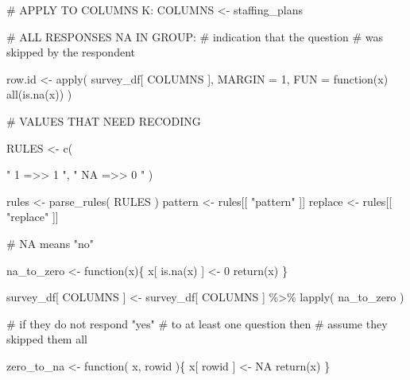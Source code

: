 \documentclass[
  letterpaper,
]{scrbook}
\newenvironment{Shaded}{\begin{snugshade}}{\end{snugshade}}
\newcommand{\AttributeTok}[1]{\textcolor[rgb]{0.40,0.45,0.13}{#1}}
\newcommand{\CommentTok}[1]{\textcolor[rgb]{0.37,0.37,0.37}{#1}}
\newcommand{\ConstantTok}[1]{\textcolor[rgb]{0.56,0.35,0.01}{#1}}
\newcommand{\ControlFlowTok}[1]{\textcolor[rgb]{0.00,0.23,0.31}{#1}}
\newcommand{\DecValTok}[1]{\textcolor[rgb]{0.68,0.00,0.00}{#1}}
\newcommand{\FunctionTok}[1]{\textcolor[rgb]{0.28,0.35,0.67}{#1}}
\newcommand{\NormalTok}[1]{\textcolor[rgb]{0.00,0.23,0.31}{#1}}
\newcommand{\OtherTok}[1]{\textcolor[rgb]{0.00,0.23,0.31}{#1}}
\newcommand{\SpecialCharTok}[1]{\textcolor[rgb]{0.37,0.37,0.37}{#1}}
\newcommand{\StringTok}[1]{\textcolor[rgb]{0.13,0.47,0.30}{#1}}
\begin{document}
\begin{Shaded}
\begin{Highlighting}[]
\CommentTok{\# APPLY TO COLUMNS K:}
\NormalTok{COLUMNS }\OtherTok{\textless{}{-}}\NormalTok{  staffing\_plans}


\CommentTok{\# ALL RESPONSES NA IN GROUP:}
\CommentTok{\# indication that the question}
\CommentTok{\# was skipped by the respondent}

\NormalTok{row.id }\OtherTok{\textless{}{-}} \FunctionTok{apply}\NormalTok{( survey\_df[ COLUMNS ], }
                 \AttributeTok{MARGIN =} \DecValTok{1}\NormalTok{, }
                 \AttributeTok{FUN =} \ControlFlowTok{function}\NormalTok{(x) }\FunctionTok{all}\NormalTok{(}\FunctionTok{is.na}\NormalTok{(x)) ) }

\CommentTok{\# VALUES THAT NEED RECODING}

\NormalTok{RULES }\OtherTok{\textless{}{-}} \FunctionTok{c}\NormalTok{(    }
          
             \StringTok{"    1    =\textgreater{}\textgreater{}     1   "}\NormalTok{, }
             \StringTok{"   NA    =\textgreater{}\textgreater{}     0   "}\NormalTok{   )}


\NormalTok{rules }\OtherTok{\textless{}{-}} \FunctionTok{parse\_rules}\NormalTok{( RULES )          }
\NormalTok{pattern }\OtherTok{\textless{}{-}}\NormalTok{ rules[[ }\StringTok{"pattern"}\NormalTok{ ]]}
\NormalTok{replace }\OtherTok{\textless{}{-}}\NormalTok{ rules[[ }\StringTok{"replace"}\NormalTok{ ]]}

\CommentTok{\# NA means "no"}

\NormalTok{na\_to\_zero }\OtherTok{\textless{}{-}} \ControlFlowTok{function}\NormalTok{(x)\{}
\NormalTok{  x[ }\FunctionTok{is.na}\NormalTok{(x) ] }\OtherTok{\textless{}{-}} \DecValTok{0}
  \FunctionTok{return}\NormalTok{(x)}
\NormalTok{\}}

\NormalTok{survey\_df[ COLUMNS ] }\OtherTok{\textless{}{-}} 
\NormalTok{  survey\_df[ COLUMNS ] }\SpecialCharTok{\%\textgreater{}\%} 
  \FunctionTok{lapply}\NormalTok{( na\_to\_zero )}

\CommentTok{\# if they do not respond "yes" }
\CommentTok{\# to at least one question then}
\CommentTok{\# assume they skipped them all}

\NormalTok{zero\_to\_na }\OtherTok{\textless{}{-}} \ControlFlowTok{function}\NormalTok{( x, rowid )\{}
\NormalTok{  x[ rowid ] }\OtherTok{\textless{}{-}} \ConstantTok{NA}
  \FunctionTok{return}\NormalTok{(x)}
\NormalTok{\}}


\end{Highlighting}
\end{Shaded}
\end{document}
